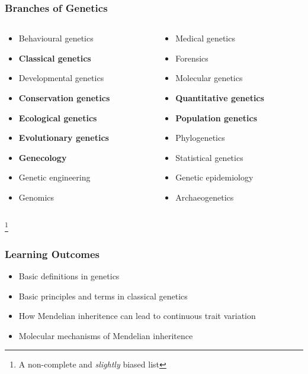 \documentclass{beamer}
\newcommand\blfootnote[1]{%
	\begingroup
	\renewcommand\thefootnote{}\footnote{#1}%
	\addtocounter{footnote}{-1}%
	\endgroup
}
\begin{document}
\begin{frame}
	
	\frametitle{Branches of Genetics}
	
	\begin{columns}[T]
		
		\begin{column}{0.45\textwidth}
			\begin{itemize}
			\item{Behavioural genetics}
			\item{\textbf{Classical genetics}}
			\item{Developmental genetics}
			\item{\textbf{Conservation genetics}}
			\item{\textbf{Ecological genetics}}
			\item{\textbf{Evolutionary genetics}}
			\item{\textbf{Genecology}}
			\item{Genetic engineering}
			\item{Genomics}
			
			\end{itemize}
			
		\end{column}
		\begin{column}{.45\textwidth}
			\begin{itemize}
			\item{Medical genetics}
				\item{Forensics}
				\item{Molecular genetics}
				\item{\textbf{Quantitative genetics}}
				\item{\textbf{Population genetics}}
				\item{Phylogenetics}
				\item{Statistical genetics}
				\item{Genetic epidemiology}
				\item{Archaeogenetics}
			\end{itemize}
		\end{column}
		\end{columns}
		\blfootnote{A non-complete and \textit{slightly} biased list}
\end{frame}


\begin{frame}
	
	\frametitle{Learning Outcomes}
	
	\Large
	\begin{itemize}
	\item   Basic definitions in genetics
	\item	Basic principles and terms in classical genetics
	\item   How Mendelian inheritence can lead to continuous trait variation 
	\item	Molecular mechanisms of Mendelian inheritence
	\end{itemize}
	
\end{frame}
\end{document}
